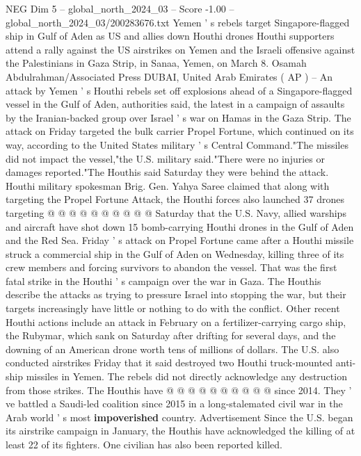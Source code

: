 \begin{textsample}{NEG Dim 5 – global\_north\_2024\_03 – Score -1.00 – global\_north\_2024\_03/200283676.txt}  \label{ex:f5_neg_161}
Yemen ' s rebels target Singapore-flagged ship in Gulf of Aden as US and allies down Houthi drones Houthi supporters attend a rally against the US airstrikes on Yemen and the Israeli offensive against the Palestinians in Gaza Strip, in Sanaa, Yemen, on March 8.
Osamah Abdulrahman/Associated Press DUBAI, United Arab Emirates ( AP ) -- An attack by Yemen ' s Houthi rebels set off explosions ahead of a Singapore-flagged vessel in the Gulf of Aden, authorities said, the latest in a campaign of assaults by the Iranian-backed group over Israel ' s war on Hamas in the Gaza Strip.
The attack on Friday targeted the bulk carrier Propel Fortune, which continued on its way, according to the United States military ' s Central Command."The missiles did not impact the vessel,"the U.S. military said."There were no injuries or damages reported."The Houthis said Saturday they were behind the attack.
Houthi military spokesman Brig.
Gen.
Yahya Saree claimed that along with targeting the Propel Fortune Attack, the Houthi forces also launched 37 drones targeting @ @ @ @ @ @ @ @ @ @ Saturday that the U.S.
Navy, allied warships and aircraft have shot down 15 bomb-carrying Houthi drones in the Gulf of Aden and the Red Sea.
Friday ' s attack on Propel Fortune came after a Houthi missile struck a commercial ship in the Gulf of Aden on Wednesday, killing three of its crew members and forcing survivors to abandon the vessel.
That was the first fatal strike in the Houthi ' s campaign over the war in Gaza.
The Houthis describe the attacks as trying to pressure Israel into stopping the war, but their targets increasingly have little or nothing to do with the conflict.
Other recent Houthi actions include an attack in February on a fertilizer-carrying cargo ship, the Rubymar, which sank on Saturday after drifting for several days, and the downing of an American drone worth tens of millions of dollars.
The U.S. also conducted airstrikes Friday that it said destroyed two Houthi truck-mounted anti-ship missiles in Yemen.
The rebels did not directly acknowledge any destruction from those strikes.
The Houthis have @ @ @ @ @ @ @ @ @ @ since 2014.
They ' ve battled a Saudi-led coalition since 2015 in a long-stalemated civil war in the Arab world ' s most \textbf{impoverished} country.
Advertisement Since the U.S. began its airstrike campaign in January, the Houthis have acknowledged the killing of at least 22 of its fighters.
One civilian has also been reported killed.

\end{textsample}
